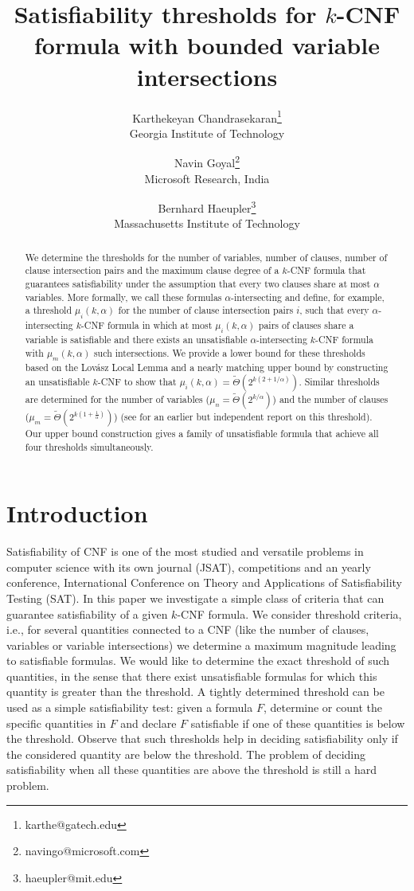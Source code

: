 \documentclass[11pt,letterpaper]{article}
\title{Satisfiability thresholds for $k$-CNF formula with bounded variable intersections}
\author{Karthekeyan Chandrasekaran\thanks{karthe@gatech.edu} \\ \small Georgia Institute of Technology \and Navin Goyal\thanks{navingo@microsoft.com}\\ \small Microsoft Research, India \and Bernhard Haeupler\thanks{haeupler@mit.edu} \\ \small Massachusetts Institute of Technology}
\date{}
\begin{document}
\maketitle

\begin{abstract}
We determine the thresholds for the number of variables, number of clauses, number of clause intersection pairs and the maximum clause degree of a $k$-CNF formula that guarantees satisfiability under the assumption that every two clauses share at most $\alpha$ variables. More formally, we call these formulas $\alpha$-intersecting and define, for example, a threshold $\mu_i(k,\alpha)$ for the number of clause intersection pairs $i$, such that every $\alpha$-intersecting $k$-CNF formula in which at most $\mu_i(k,\alpha)$ pairs of clauses share a variable is satisfiable and there exists an unsatisfiable $\alpha$-intersecting $k$-CNF formula with $\mu_m(k,\alpha)$ such intersections. We provide a lower bound for these thresholds based on the Lov\'asz Local Lemma and a nearly matching upper bound by constructing an unsatisfiable $k$-CNF to show that $\mu_i(k,\alpha) = \tilde{\Theta}(2^{k(2+1/\alpha)})$. Similar thresholds are determined for the number of variables ($\mu_n = \tilde{\Theta}(2^{k/\alpha})$) and the number of clauses ($\mu_m = \tilde{\Theta}(2^{k(1+\frac{1}{\alpha})})$) (see \cite{scheder08almostdisjoint} for an earlier but independent report on this threshold). Our upper bound construction gives a family of unsatisfiable formula that achieve all four thresholds simultaneously.
\end{abstract}



\bigskip

\section{Introduction}

Satisfiability of CNF is one of the most studied and versatile problems in computer science with its own journal (JSAT), competitions and an yearly conference, International Conference on Theory and Applications of Satisfiability Testing (SAT). In this paper we investigate a simple class of criteria that can guarantee satisfiability of a given $k$-CNF formula. We consider threshold criteria, i.e., for several quantities connected to a CNF (like the number of clauses, variables or variable intersections) we determine a maximum magnitude leading to satisfiable formulas. We would like to determine the exact threshold of such quantities, in the sense that there exist unsatisfiable formulas for which this quantity is greater than the threshold. A tightly determined threshold can be used as a simple satisfiability test: given a formula $F$, determine or count the specific quantities in $F$ and declare $F$ satisfiable if one of these quantities is below the threshold. Observe that such thresholds help in deciding satisfiability only if the considered quantity are below the threshold. The problem of deciding satisfiability when all these quantities are above the threshold is still a hard problem.\\
\end{document}

